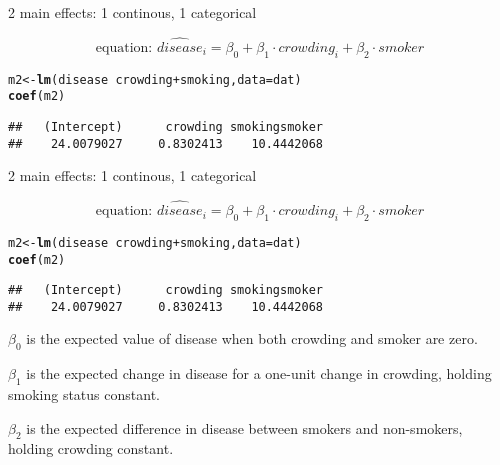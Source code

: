 \documentclass[table]{beamer}\usepackage[]{graphicx}\usepackage[]{color}
\makeatletter
\newcommand{\hlopt}[1]{\textcolor[rgb]{0,0,0}{#1}}%
\newcommand{\hlstd}[1]{\textcolor[rgb]{0.345,0.345,0.345}{#1}}%
\newcommand{\hlkwb}[1]{\textcolor[rgb]{0.69,0.353,0.396}{#1}}%
\newcommand{\hlkwc}[1]{\textcolor[rgb]{0.333,0.667,0.333}{#1}}%
\newcommand{\hlkwd}[1]{\textcolor[rgb]{0.737,0.353,0.396}{\textbf{#1}}}%
\newenvironment{kframe}{%
 \def\at@end@of@kframe{}%
 \ifinner\ifhmode%
  \def\at@end@of@kframe{\end{minipage}}%
  \begin{minipage}{\columnwidth}%
 \fi\fi%
 \def\FrameCommand##1{\hskip\@totalleftmargin \hskip-\fboxsep
 \colorbox{shadecolor}{##1}\hskip-\fboxsep
     \hskip-\linewidth \hskip-\@totalleftmargin \hskip\columnwidth}%
 \MakeFramed {\advance\hsize-\width
   \@totalleftmargin\z@ \linewidth\hsize
   \@setminipage}}%
 {\par\unskip\endMakeFramed%
 \at@end@of@kframe}
\newenvironment{knitrout}{}{} %
\makeatother
\begin{document}

\begin{frame}[fragile]{2 main effects: 1 continous, 1 categorical}

$$ \mbox{equation: \ }  \widehat{disease}_i = \beta_0 + \beta_1\cdot crowding_i + \beta_2 \cdot smoker $$

\begin{knitrout}\scriptsize
{}\color{fgcolor}\begin{kframe}
\begin{alltt}
\hlstd{m2} \hlkwb{<-} \hlkwd{lm}\hlstd{(disease} \hlopt{~} \hlstd{crowding} \hlopt{+} \hlstd{smoking,} \hlkwc{data}\hlstd{=dat)}
\hlkwd{coef}\hlstd{(m2)}
\end{alltt}
\begin{verbatim}
##   (Intercept)      crowding smokingsmoker 
##    24.0079027     0.8302413    10.4442068
\end{verbatim}
\end{kframe}
\end{knitrout}

\end{frame}



\begin{frame}[fragile]{2 main effects: 1 continous, 1 categorical}

$$ \mbox{equation: \ }  \widehat{disease}_i = \beta_0 + \beta_1\cdot crowding_i + \beta_2 \cdot smoker $$

\begin{knitrout}\scriptsize
{}\color{fgcolor}\begin{kframe}
\begin{alltt}
\hlstd{m2} \hlkwb{<-} \hlkwd{lm}\hlstd{(disease} \hlopt{~} \hlstd{crowding} \hlopt{+} \hlstd{smoking,} \hlkwc{data}\hlstd{=dat)}
\hlkwd{coef}\hlstd{(m2)}
\end{alltt}
\begin{verbatim}
##   (Intercept)      crowding smokingsmoker 
##    24.0079027     0.8302413    10.4442068
\end{verbatim}
\end{kframe}
\end{knitrout}

$\beta_0$ is the expected value of disease when both crowding and smoker are zero.

$\beta_1$ is the expected change in disease for a one-unit change in crowding, holding smoking status constant.

$\beta_2$ is the expected difference in disease between smokers and non-smokers, holding crowding constant.


\end{frame}
\end{document}
